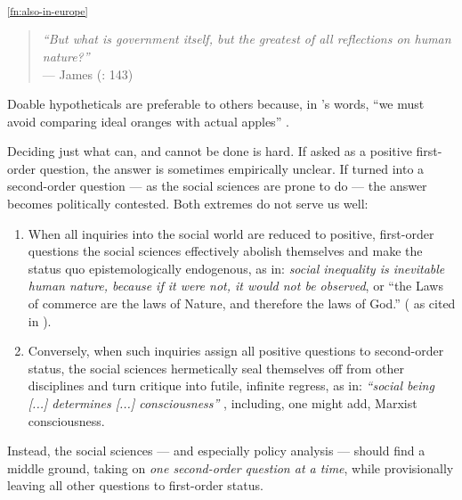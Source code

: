\textsuperscript{\ref{fn:also-in-europe}}



\begin{quote}
	\emph{``But what is government itself, but the greatest of all reflections on human nature?''}\\
	--- James \citeauthor{Madison1788} (\citeyear{Madison1788}: 143)
\end{quote}

Doable hypotheticals are preferable to others because, in \citeauthor{Dahl-1989-aa}'s words, ``we must avoid comparing ideal oranges with actual apples'' \citeyearpar[84]{Dahl-1989-aa}. 

Deciding just what can, and cannot be done is hard. 
If asked as a positive first-order question, the answer is sometimes empirically unclear. 
If turned into a second-order question --- as the social sciences are prone to do --- the answer becomes politically contested. 
Both extremes do not serve us well:
\begin{enumerate}
	\item 
		When all inquiries into the social world are reduced to positive, first-order questions the social sciences effectively abolish themselves and make the status quo epistemologically endogenous, as in: \emph{social inequality is inevitable human nature, because if it were not, it would not be observed}, or ``the Laws of commerce are the laws of Nature, and therefore the laws of God.'' (\citeauthor{Burke1790} as cited in \citealt[834]{Marx-1867-aa}).%
	\item 
	Conversely, when such inquiries assign all positive questions to second-order status, the social sciences hermetically seal themselves off from other disciplines and turn critique into futile, infinite regress, as in: \emph{``social being [...] determines [...] consciousness''} \citep[Preface]{Marx1859}, including, one might add, Marxist consciousness. %
\end{enumerate}

Instead, the social sciences --- and especially policy analysis --- should find a middle ground, taking on \emph{one second-order question at a time}, while provisionally leaving all other questions to first-order status. 

